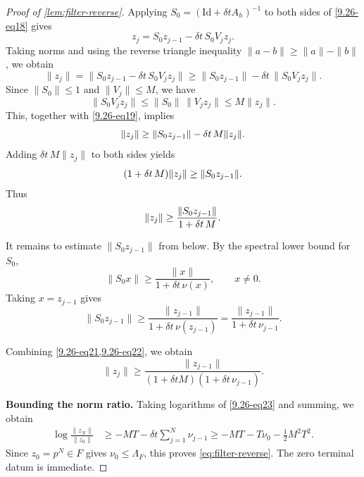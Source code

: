 \documentclass[print,wide,eng]{draft}
\begin{document}
\begin{proof}[Proof of \cref{lem:filter-reverse}]
Applying \(S_0=(\mathrm{Id}+\delta t A_h)^{-1}\) to both sides of \eqref{9.26-eq18} gives
%
\[
z_j=S_0z_{j-1}-\delta t\,S_0V_jz_j.
\]
%
Taking norms and using the reverse triangle inequality
$
\|a-b\|\ge \|a\|-\|b\|$,
we obtain
%
\begin{equation}\label{9.26-eq19}
\|z_j\|
=\|S_0z_{j-1}-\delta t\,S_0V_jz_j\|
\ge \|S_0z_{j-1}\|-\delta t\,\|S_0V_jz_j\|.
\end{equation}
%
Since $\|S_0\|\le1$ and $\|V_j\|\le M$, we have
$$
\|S_0V_jz_j\|
\le \|S_0\|\,\|V_jz_j\|
\leq M\|z_j\|.
$$
This, together with \eqref{9.26-eq19}, implies\vspace{-2mm}
%
\begin{equation}\label{9.26-eq20}
\|z_j\|
\ge \|S_0z_{j-1}\|-\delta t\,M\|z_j\|.\vspace{-2mm}
\end{equation}
%
Adding $\delta t\,M\|z_j\|$ to both sides yields\vspace{-2mm}
%
$$
(1+\delta t\,M)\|z_j\|
\ge \|S_0z_{j-1}\|.\vspace{-2mm}
$$
%
Thus\vspace{-2mm}
%
\begin{equation}\label{9.26-eq21}
\|z_j\|
\ge \frac{\|S_0z_{j-1}\|}{1+\delta t\,M}.\vspace{-2mm}
\end{equation}
%

It remains to estimate $\|S_0z_{j-1}\|$ from below. By the spectral lower bound for $S_0$,
$$
\|S_0x\|\ge \frac{\|x\|}{1+\delta t\,\nu(x)},
\qquad x\ne0.
$$
Taking $x=z_{j-1}$ gives\vspace{-2mm}
%
\begin{equation}\label{9.26-eq22}
\|S_0z_{j-1}\|
\ge \frac{\|z_{j-1}\|}{1+\delta t\,\nu(z_{j-1})}
=
\frac{\|z_{j-1}\|}{1+\delta t\,\nu_{j-1}}.
\end{equation}
%

Combining \cref{9.26-eq21,9.26-eq22}, we obtain\vspace{-2mm}
%
\begin{equation}\label{9.26-eq23}
\|z_j\|\ge\frac{\|z_{j-1}\|}{(1+\delta t M)(1+\delta t\,\nu_{j-1})}.
\end{equation}
%

\textbf{Bounding the norm ratio.}
Taking logarithms of \cref{9.26-eq23} and summing, we obtain\vspace{-2mm}
\begin{align*}
	\log\frac{\|z_N\|}{\|z_0\|}
	&\ge-MT-\delta t\sum_{j=1}^N\nu_{j-1}
	\ge-MT-T\nu_0-\frac12M^2T^2.
\end{align*}
Since $z_0=p^N\in F$ gives $\nu_0\le\Lambda_F$, this proves \cref{eq:filter-reverse}. The zero terminal datum is immediate.
\end{proof}
%
\end{document}
